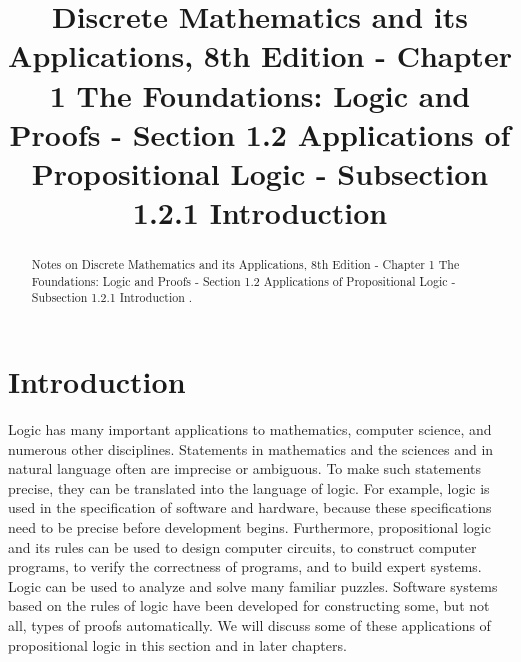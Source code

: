 \documentclass{Axon}
\title{Discrete Mathematics and its Applications, 8th Edition - Chapter 1 The Foundations: Logic and Proofs - Section 1.2 Applications of Propositional Logic - Subsection 1.2.1 Introduction}
\begin{document}
\maketitle
\makeauthor
\begin{abstract}
Notes on Discrete Mathematics and its Applications, 8th Edition - Chapter 1 The Foundations: Logic and Proofs - Section 1.2 Applications of Propositional Logic - Subsection 1.2.1 Introduction \cite{Rosen}.
\end{abstract}
\section{Introduction}
Logic has many important applications to mathematics, computer science, and numerous other disciplines. Statements in mathematics and the sciences and in natural language often are imprecise or ambiguous. To make such statements precise, they can be translated into the language of logic. For example, logic is used in the specification of software and hardware, because these specifications need to be precise before development begins. Furthermore, propositional logic and its rules can be used to design computer circuits, to construct computer programs, to verify the correctness of programs, and to build expert systems. Logic can be used to analyze and solve many familiar puzzles. Software systems based on the rules of logic have been developed for constructing some, but not all, types of proofs automatically. We will discuss some of these applications of propositional logic in this section and in later chapters.

\printbibliography
\end{document}
